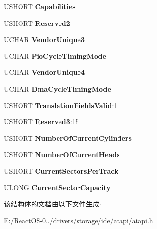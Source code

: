 \begin{DoxyCompactItemize}
U\+S\+H\+O\+RT {\bfseries Capabilities}
\item 
\mbox{\label{struct___i_d_e_n_t_i_f_y___d_a_t_a2_a010c04218ac78bc3b122ac73202fcccc}} 
U\+S\+H\+O\+RT {\bfseries Reserved2}
\item 
\mbox{\label{struct___i_d_e_n_t_i_f_y___d_a_t_a2_a09374dd90b140ab7c5b619c21009b938}} 
U\+C\+H\+AR {\bfseries Vendor\+Unique3}
\item 
\mbox{\label{struct___i_d_e_n_t_i_f_y___d_a_t_a2_afacd85155ccfdc800d3bf912772182b2}} 
U\+C\+H\+AR {\bfseries Pio\+Cycle\+Timing\+Mode}
\item 
\mbox{\label{struct___i_d_e_n_t_i_f_y___d_a_t_a2_a58d14df3fa59f5881a397868406a3079}} 
U\+C\+H\+AR {\bfseries Vendor\+Unique4}
\item 
\mbox{\label{struct___i_d_e_n_t_i_f_y___d_a_t_a2_af5a82f9baecc8df201185989233ada85}} 
U\+C\+H\+AR {\bfseries Dma\+Cycle\+Timing\+Mode}
\item 
\mbox{\label{struct___i_d_e_n_t_i_f_y___d_a_t_a2_a1fc646ec72d4d464301ec5f05bb3c23a}} 
U\+S\+H\+O\+RT {\bfseries Translation\+Fields\+Valid}\+:1
\item 
\mbox{\label{struct___i_d_e_n_t_i_f_y___d_a_t_a2_a5b9fedafa31258c28d19d4c09fac5b95}} 
U\+S\+H\+O\+RT {\bfseries Reserved3}\+:15
\item 
\mbox{\label{struct___i_d_e_n_t_i_f_y___d_a_t_a2_aaa1c2d053f0038bf1ed6829f7e970ea4}} 
U\+S\+H\+O\+RT {\bfseries Number\+Of\+Current\+Cylinders}
\item 
\mbox{\label{struct___i_d_e_n_t_i_f_y___d_a_t_a2_a396b4119adcc5ec7e25226b0b9827013}} 
U\+S\+H\+O\+RT {\bfseries Number\+Of\+Current\+Heads}
\item 
\mbox{\label{struct___i_d_e_n_t_i_f_y___d_a_t_a2_a258192cf7c7ff8500f139febe6c36782}} 
U\+S\+H\+O\+RT {\bfseries Current\+Sectors\+Per\+Track}
\item 
\mbox{\label{struct___i_d_e_n_t_i_f_y___d_a_t_a2_aa16c263d95c3001b4508deff8c4d76f8}} 
U\+L\+O\+NG {\bfseries Current\+Sector\+Capacity}
\end{DoxyCompactItemize}


该结构体的文档由以下文件生成\+:\begin{DoxyCompactItemize}
\item 
E\+:/\+React\+O\+S-\/0../drivers/storage/ide/atapi/atapi.\+h\end{DoxyCompactItemize}
